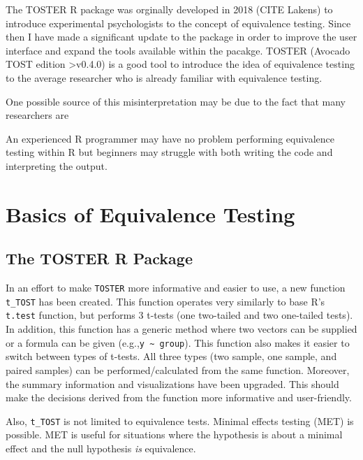 \documentclass[]{interact}
\theoremstyle{plain}%
\theoremstyle{definition}
\theoremstyle{remark}
\begin{document}
The TOSTER R package was orginally developed in 2018 (CITE Lakens) to
introduce experimental psychologists to the concept of equivalence
testing. Since then I have made a significant update to the package in
order to improve the user interface and expand the tools available
within the pacakge. TOSTER (Avocado TOST edition \textgreater v0.4.0) is
a good tool to introduce the idea of equivalence testing to the average
researcher who is already familiar with equivalence testing.

One possible source of this misinterpretation may be due to the fact
that many researchers are

An experienced R programmer may have no problem performing equivalence
testing within R but beginners may struggle with both writing the code
and interpreting the output.

\hypertarget{basics-of-equivalence-testing}{%
\section{Basics of Equivalence
Testing}\label{basics-of-equivalence-testing}}

\hypertarget{the-toster-r-package}{%
\subsection{The TOSTER R Package}\label{the-toster-r-package}}

In an effort to make \texttt{TOSTER} more informative and easier to use,
a new function \texttt{t\_TOST} has been created. This function operates
very similarly to base R's \texttt{t.test} function, but performs 3
t-tests (one two-tailed and two one-tailed tests). In addition, this
function has a generic method where two vectors can be supplied or a
formula can be given (e.g.,\texttt{y\ \textasciitilde{}\ group}). This
function also makes it easier to switch between types of t-tests. All
three types (two sample, one sample, and paired samples) can be
performed/calculated from the same function. Moreover, the summary
information and visualizations have been upgraded. This should make the
decisions derived from the function more informative and user-friendly.

Also, \texttt{t\_TOST} is not limited to equivalence tests. Minimal
effects testing (MET) is possible. MET is useful for situations where
the hypothesis is about a minimal effect and the null hypothesis
\emph{is} equivalence.
\end{document}
